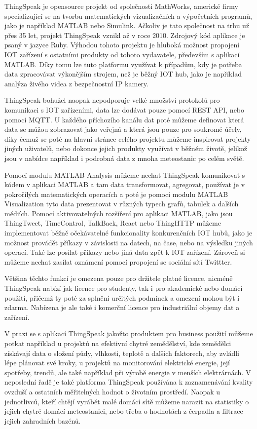 ThingSpeak je opensource projekt od společnosti MathWorks, americké firmy specializující se na tvorbu matematických vizualizačních a výpočetních programů, jako je například MATLAB nebo Simulink. Ačkoliv je tato společnost na trhu už přes 35 let, projekt ThingSpeak vznikl až v roce 2010. Zdrojový kód aplikace je psaný v jazyce Ruby. Výhodou tohoto projektu je hluboká možnost propojení IOT zařízení s ostatními produkty od tohoto vydavatele, především s aplikací MATLAB. Díky tomu lze tuto platformu využívat k případům, kdy je potřeba data zpracovávat výkonějším strojem, než je běžný IOT hub, jako je například analýza živého videa z bezpečnostní IP kamery.

ThingSpeak bohužel naopak nepodporuje velké množství protokolů pro komunikaci s IOT zařízeními, data lze dodávat pouze pomocí REST API, nebo pomocí MQTT. U každého příchozího kanálu dat poté můžeme definovat která data se můžou zobrazovat jako veřejná a která jsou pouze pro soukromé účely, díky čemuž se poté na hlavní stránce celého projektu můžeme inspirovat projekty jiných uživatelů, nebo dokonce jejich produkty využívat v běžném životě, jelikož jsou v nabídce například i podrobná data z mnoha meteostanic po celém světě. 

Pomocí modulu MATLAB Analysis můžeme nechat ThingSpeak komunikovat s kódem v aplikaci MATLAB a tam data transformovat, agregovat, používat je v pokrořilých matematických operacích a poté je pomocí modulu MATLAB Visualization tyto data prezentovat v různých typech grafů, tabulek a dalších médiích. Pomocí aktivovatelných rozšíření pro aplikaci MATLAB, jako jsou ThingTweet, TimeControl, TalkBack, React nebo ThingHTTP můžeme implementovat běžně očekávatelné funkcionality konkurenčních IOT hubů, jako je možnost provádět příkazy v závislosti na datech, na čase, nebo na výsledku jiných operací. Také lze posílat příkazy nebo jiná data zpět k IOT zařízení. Zároveň si můžeme nechat zasílat oznámení pomocí propojení se sociální sítí Twittter.

Většina těchto funkcí je omezena pouze pro držitele platné licence, nicméně ThingSpeak nabízí jak licence pro studenty, tak i pro akademické nebo domácí použití, přičemž ty poté za splnění určitých podmínek a omezení mohou být i zdarma. Nabízena je ale také i komerční licence pro industriální objemy dat a zařízení.

V praxi se s aplikací ThingSpeak jakožto produktem pro business použití můžeme potkat například u projektů na efektivní chytré zemědělství, kde zemědělci získávají data o složení půdy, vlhkosti, teplotě a dalších faktorech, aby zvládli lépe plánovat své kroky, u projektů na monitorování elektrické energie, její spotřeby, trendů, ale také například při výrobě energie v menších elektrárnách. V neposlední řadě je také platforma ThingSpeak používána k zaznamenávání kvality ovzduší a ostatních měřitelných hodnot o životním prostředí. Naopak u jednotlivců, kteří chtějí vyrábět malé domácí sítě můžeme narazit na statistiky o jejich chytré domácí meteostanici, nebo třeba o hodnotách z čerpadla a filtrace jejich zahradních bazénů.

